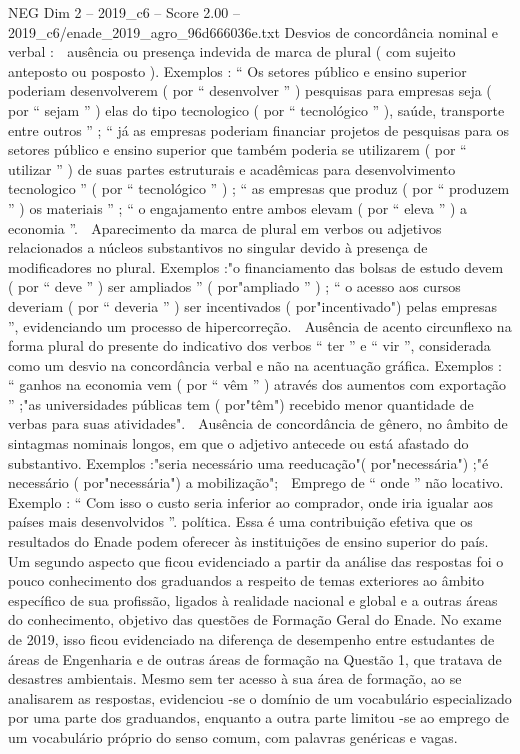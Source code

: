 \begin{textsample}{NEG Dim 2 – 2019\_c6 – Score 2.00 – 2019\_c6/enade\_2019\_agro\_96d666036e.txt}
Desvios de concordância nominal e verbal :  ausência ou presença indevida de marca de plural ( com sujeito anteposto ou posposto ).
Exemplos : “ Os setores público e ensino superior poderiam desenvolverem ( por “ desenvolver ” ) pesquisas para empresas seja ( por “ sejam ” ) elas do tipo tecnologico ( por “ tecnológico ” ), saúde, transporte entre outros ” ; “ já as empresas poderiam financiar projetos de pesquisas para os setores público e ensino superior que também poderia se utilizarem ( por “ utilizar ” ) de suas partes estruturais e acadêmicas para desenvolvimento tecnologico ” ( por “ tecnológico ” ) ; “ as empresas que produz ( por “ produzem ” ) os materiais ” ; “ o engajamento entre ambos elevam ( por “ eleva ” ) a economia ”.  Aparecimento da marca de plural em verbos ou adjetivos relacionados a núcleos substantivos no singular devido à presença de modificadores no plural.
Exemplos :"o financiamento das bolsas de estudo devem ( por “ deve ” ) ser ampliados ” ( por"ampliado ” ) ; “ o acesso aos cursos deveriam ( por “ deveria ” ) ser incentivados ( por"incentivado") pelas empresas ”, evidenciando um processo de hipercorreção.  Ausência de acento circunflexo na forma plural do presente do indicativo dos verbos “ ter ” e “ vir ”, considerada como um desvio na concordância verbal e não na acentuação gráfica.
Exemplos : “ ganhos na economia vem ( por “ vêm ” ) através dos aumentos com exportação ” ;"as universidades públicas tem ( por"têm") recebido menor quantidade de verbas para suas atividades".  Ausência de concordância de gênero, no âmbito de sintagmas nominais longos, em que o adjetivo antecede ou está afastado do substantivo.
Exemplos :"seria necessário uma reeducação"( por"necessária") ;"é necessário ( por"necessária") a mobilização";  Emprego de “ onde ” não locativo.
Exemplo : “ Com isso o custo seria inferior ao comprador, onde iria igualar aos países mais desenvolvidos ”. política.
Essa é uma contribuição efetiva que os resultados do Enade podem oferecer às instituições de ensino superior do país.
Um segundo aspecto que ficou evidenciado a partir da análise das respostas foi o pouco conhecimento dos graduandos a respeito de temas exteriores ao âmbito específico de sua profissão, ligados à realidade nacional e global e a outras áreas do conhecimento, objetivo das questões de Formação Geral do Enade.
No exame de 2019, isso ficou evidenciado na diferença de desempenho entre estudantes de áreas de Engenharia e de outras áreas de formação na Questão 1, que tratava de desastres ambientais.
Mesmo sem ter acesso à sua área de formação, ao se analisarem as respostas, evidenciou -se o domínio de um vocabulário especializado por uma parte dos graduandos, enquanto a outra parte limitou -se ao emprego de um vocabulário próprio do senso comum, com palavras genéricas e vagas.

\end{textsample}
